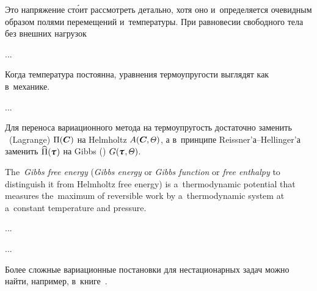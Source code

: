 \begin{otherlanguage}{russian}

Это напряжение ст\'{о}ит рассмотреть детально, хотя оно и~определяется очевидным образом полями перемещений и~температуры. При равновесии свободного тела без внешних нагрузок

...



\end{otherlanguage}



\label{para:variationalformulations.thermoelasticity}

\begin{otherlanguage}{russian}

Когда температура постоянна, уравнения термоупругости выглядят как в~механике.

...

Для переноса вариационного метода на термоупругость достаточно заменить ~(Lagrange)  ${\Pi(\bm{C})}$ на Helmholtz ${A(\bm{C}\hspace{-0.12ex}, \temperaturefield)}$, а в~принципе Reissner’а--Hellinger’а заменить ${\widehat{\potential}(\hspace{-0.1ex}\cauchystress\hspace{.12ex})}$ на Gibbs () ${G(\hspace{-0.1ex}\cauchystress\hspace{.12ex}, \temperaturefield)}$.

{\small
The~\emph{Gibbs free energy} (\emph{Gibbs energy} or \emph{Gibbs function} or \emph{free enthalpy} to distinguish it from Helmholtz free energy) is a~thermodynamic potential that measures the~maximum of reversible work by a~thermodynamic system at a~constant temperature and pressure.
\par}

...

...

Более сложные вариационные постановки для нестационарных задач можно найти, например, в~книге~\cite{belyaev.ryadno}.

\end{otherlanguage}


